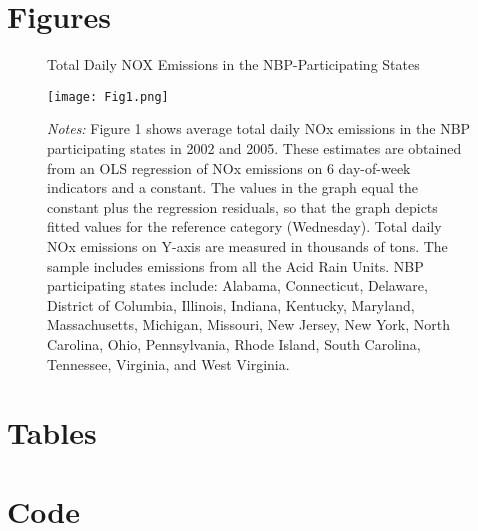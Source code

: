 \documentclass[12pt]{article}
\begin{document}
\clearpage
\section*{Figures}

\begin{figure}[h!]
\centering
\caption{Total Daily NOX Emissions in the NBP-Participating States}
\texttt{[image: Fig1.png]}
\caption*{\footnotesize{\emph{Notes:} Figure 1 shows average total daily NOx emissions in the NBP participating states in 2002 and 2005. These estimates are obtained from an OLS regression of NOx emissions on 6 day-of-week indicators and a constant. The values in the graph equal the constant plus the regression residuals, so that the graph depicts fitted values for the reference category (Wednesday). Total daily NOx emissions on Y-axis are measured in thousands of tons. The sample includes emissions from all the Acid Rain Units. NBP participating states include: Alabama, Connecticut, Delaware, District of Columbia, Illinois, Indiana, Kentucky, Maryland, Massachusetts, Michigan, Missouri, New Jersey, New York, North Carolina, Ohio, Pennsylvania, Rhode Island, South Carolina, Tennessee, Virginia, and West Virginia.}}
\label{fig1}
\end{figure}

\clearpage

\section*{Tables}



\clearpage

\section*{Code}
\end{document}
